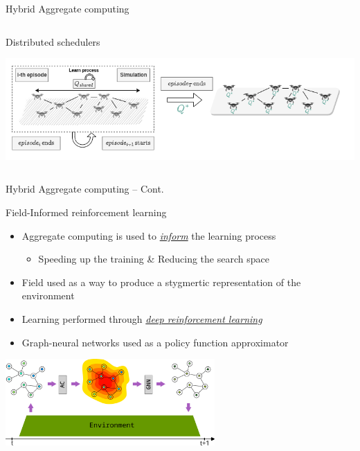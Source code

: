\documentclass[presentation, 9pt, aspectratio=169]{beamer}\mode<presentation>{\usetheme{AMSBolognaFC}}
\begin{document}
\begin{frame}{Hybrid Aggregate computing}
\begin{columns}[t]
\begin{column}{0.31\textwidth}
\begin{exampleblock}{Distributed schedulers~\cite{DBLP:conf/acsos/AguzziCV22}}
{\begin{itemize}
  \end{itemize}
  }
  \includegraphics[width=\textwidth]{img/algorithm-learning.png}
\end{exampleblock}
\end{column}  
\end{columns}
\end{frame}

\begin{frame}{Hybrid Aggregate computing -- Cont.}
  
\begin{exampleblock}{Field-Informed reinforcement learning~\cite{acgnn}}
  \begin{itemize}
    \item Aggregate computing is used to \emph{\underline{inform}} the learning process
    \begin{itemize}
      \item Speeding up the training \& Reducing the search space
    \end{itemize} 
    \item Field used as a way to produce a stygmertic representation of the environment
    \item Learning performed through \emph{\underline{deep reinforcement learning}}
    \item Graph-neural networks used as a policy function approximator
  \end{itemize}
\centering
  \includegraphics[width=0.6\textwidth]{img/architecture.pdf}
\end{exampleblock}
\end{frame}
\end{document}
